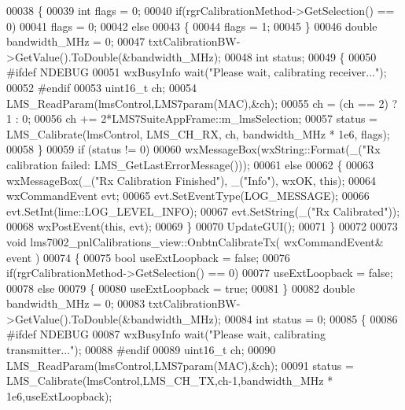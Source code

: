 \begin{DoxyCode}
00038 \{
00039     \textcolor{keywordtype}{int} flags = 0;
00040     \textcolor{keywordflow}{if}(rgrCalibrationMethod->GetSelection() == 0)
00041         flags = 0;
00042     \textcolor{keywordflow}{else}
00043     \{
00044         flags = 1;
00045     \}
00046     \textcolor{keywordtype}{double} bandwidth\_MHz = 0;
00047     txtCalibrationBW->GetValue().ToDouble(&bandwidth\_MHz);
00048     \textcolor{keywordtype}{int} status;
00049     \{
00050 \textcolor{preprocessor}{#ifdef NDEBUG}
00051         wxBusyInfo wait(\textcolor{stringliteral}{"Please wait, calibrating receiver..."});
00052 \textcolor{preprocessor}{#endif}
00053         uint16\_t ch;
00054         LMS_ReadParam(lmsControl,LMS7param(MAC),&ch);
00055         ch = (ch == 2) ? 1 : 0;
00056         ch += 2*LMS7SuiteAppFrame::m_lmsSelection;
00057         status = LMS_Calibrate(lmsControl, LMS_CH_RX, ch, bandwidth\_MHz * 1e6, flags);
00058     \}
00059     \textcolor{keywordflow}{if} (status != 0)
00060         wxMessageBox(wxString::Format(\_(\textcolor{stringliteral}{"Rx calibration failed: %
      LMS_GetLastErrorMessage()));
00061     \textcolor{keywordflow}{else}
00062     \{
00063         wxMessageBox(\_(\textcolor{stringliteral}{"Rx Calibration Finished"}), \_(\textcolor{stringliteral}{"Info"}), wxOK, \textcolor{keyword}{this});
00064         wxCommandEvent evt;
00065         evt.SetEventType(LOG\_MESSAGE);
00066         evt.SetInt(lime::LOG_LEVEL_INFO);
00067         evt.SetString(\_(\textcolor{stringliteral}{"Rx Calibrated"}));
00068         wxPostEvent(\textcolor{keyword}{this}, evt);
00069     \}
00070     UpdateGUI();
00071 \}
00072 
00073 \textcolor{keywordtype}{void} lms7002_pnlCalibrations_view::OnbtnCalibrateTx( wxCommandEvent& event )
00074 \{
00075     \textcolor{keywordtype}{bool} useExtLoopback = \textcolor{keyword}{false};
00076     \textcolor{keywordflow}{if}(rgrCalibrationMethod->GetSelection() == 0)
00077         useExtLoopback = \textcolor{keyword}{false};
00078     \textcolor{keywordflow}{else}
00079     \{
00080         useExtLoopback = \textcolor{keyword}{true};
00081     \}
00082     \textcolor{keywordtype}{double} bandwidth\_MHz = 0;
00083     txtCalibrationBW->GetValue().ToDouble(&bandwidth\_MHz);
00084     \textcolor{keywordtype}{int} status = 0;
00085     \{
00086 \textcolor{preprocessor}{#ifdef NDEBUG}
00087         wxBusyInfo wait(\textcolor{stringliteral}{"Please wait, calibrating transmitter..."});
00088 \textcolor{preprocessor}{#endif}
00089         uint16\_t ch;
00090         LMS_ReadParam(lmsControl,LMS7param(MAC),&ch);
00091         status = LMS_Calibrate(lmsControl,LMS_CH_TX,ch-1,bandwidth\_MHz * 1e6,useExtLoopback);
}
\end{DoxyCode}
